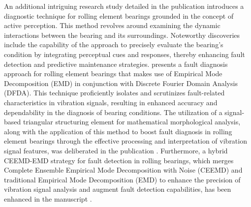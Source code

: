 \documentclass[sn-basic,pdflatex]{sn-jnl}
\theoremstyle{remark}
\theoremstyle{definition}
\begin{document}
An additional intriguing research study detailed in the publication
\citet{WOS:000360994300029} introduces a diagnostic technique for
rolling element bearings grounded in the concept of active perception.
This method revolves around examining the dynamic interactions between
the bearing and its surroundings. Noteworthy discoveries include the
capability of the approach to precisely evaluate the bearing's condition
by integrating perceptual cues and responses, thereby enhancing fault
detection and predictive maintenance strategies.
\citet{WOS:000343577703075} presents a fault diagnosis approach for
rolling element bearings that makes use of Empirical Mode Decomposition
(EMD) in conjunction with Discrete Fourier Domain Analysis (DFDA). This
technique proficiently isolates and scrutinizes fault-related
characteristics in vibration signals, resulting in enhanced accuracy and
dependability in the diagnosis of bearing conditions. The utilization of
a signal-based triangular structuring element for mathematical
morphological analysis, along with the application of this method to
boost fault diagnosis in rolling element bearings through the effective
processing and interpretation of vibration signal features, was
deliberated in the publication \citep{WOS:000334316700001}. Furthermore,
a hybrid CEEMD-EMD strategy for fault detection in rolling bearings,
which merges Complete Ensemble Empirical Mode Decomposition with Noise
(CEEMD) and traditional Empirical Mode Decomposition (EMD) to enhance
the precision of vibration signal analysis and augment fault detection
capabilities, has been enhanced in the manuscript
\citet{WOS:000412752200052}.
\end{document}
